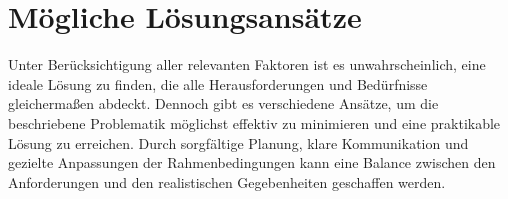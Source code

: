 \documentclass[a4paper,12pt]{article}
\begin{document}
\section{Mögliche Lösungsansätze}
Unter Berücksichtigung aller relevanten Faktoren ist es unwahrscheinlich, eine ideale Lösung zu finden, die alle Herausforderungen und Bedürfnisse gleichermaßen abdeckt. Dennoch gibt es verschiedene Ansätze, um die beschriebene Problematik möglichst effektiv zu minimieren und eine praktikable Lösung zu erreichen. Durch sorgfältige Planung, klare Kommunikation und gezielte Anpassungen der Rahmenbedingungen kann eine Balance zwischen den Anforderungen und den realistischen Gegebenheiten geschaffen werden.
\end{document}
